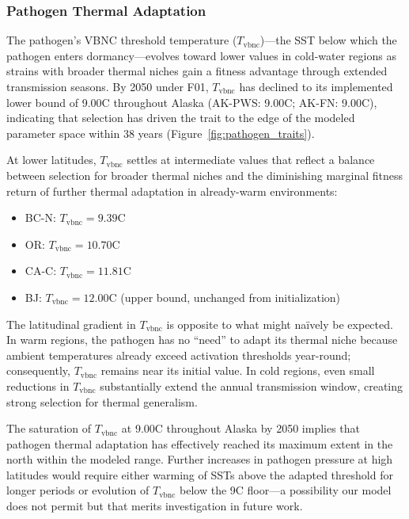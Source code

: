 \subsubsection{Pathogen Thermal Adaptation}

The pathogen's VBNC threshold temperature ($T_\mathrm{vbnc}$)---the
SST below which the pathogen enters dormancy---evolves toward lower
values in cold-water regions as strains with broader thermal niches
gain a fitness advantage through extended transmission seasons.  By
2050 under F01, $T_\mathrm{vbnc}$ has declined to its implemented
lower bound of 9.00\textdegree C throughout Alaska (AK-PWS:
9.00\textdegree C; AK-FN: 9.00\textdegree C), indicating that
selection has driven the trait to the edge of the modeled parameter
space within 38 years (Figure~\ref{fig:pathogen_traits}).

At lower latitudes, $T_\mathrm{vbnc}$ settles at intermediate values
that reflect a balance between selection for broader thermal niches and
the diminishing marginal fitness return of further thermal adaptation
in already-warm environments:

\begin{itemize}
  \item BC-N: $T_\mathrm{vbnc} = 9.39$\textdegree C
  \item OR: $T_\mathrm{vbnc} = 10.70$\textdegree C
  \item CA-C: $T_\mathrm{vbnc} = 11.81$\textdegree C
  \item BJ: $T_\mathrm{vbnc} = 12.00$\textdegree C (upper bound,
    unchanged from initialization)
\end{itemize}

\noindent
The latitudinal gradient in $T_\mathrm{vbnc}$ is opposite to what
might na\"ively be expected.  In warm regions, the pathogen has no
``need'' to adapt its thermal niche because ambient temperatures
already exceed activation thresholds year-round; consequently,
$T_\mathrm{vbnc}$ remains near its initial value.  In cold regions,
even small reductions in $T_\mathrm{vbnc}$ substantially extend the
annual transmission window, creating strong selection for thermal
generalism.

The saturation of $T_\mathrm{vbnc}$ at 9.00\textdegree C throughout
Alaska by 2050 implies that pathogen thermal adaptation has effectively
reached its maximum extent in the north within the modeled range.
Further increases in pathogen pressure at high latitudes would require
either warming of SSTs above the adapted threshold for longer periods
or evolution of $T_\mathrm{vbnc}$ below the 9\textdegree C floor---a
possibility our model does not permit but that merits investigation in
future work.


